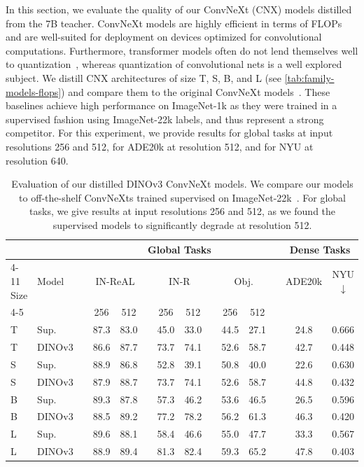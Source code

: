 In this section, we evaluate the quality of our ConvNeXt (CNX) models distilled from the 7B teacher. 
ConvNeXt models are highly efficient in terms of FLOPs and are well-suited for deployment on devices optimized for convolutional computations. 
Furthermore, transformer models often do not lend themselves well to quantization~\citep{bondarenko2021understanding}, whereas quantization of convolutional nets is a well explored subject.
We distill CNX architectures of size T, S, B, and L (see \cref{tab:family-models-flops}) and compare them to the original ConvNeXt models~\citep{liu2022convnet}.
These baselines achieve high performance on ImageNet-1k as they were trained in a supervised fashion using ImageNet-22k labels, and thus represent a strong competitor.
For this experiment, we provide results for global tasks at input resolutions 256 and 512, for ADE20k at resolution 512, and for NYU at resolution 640.

\begin{table}[t]
    \centering
    \caption{
      Evaluation of our distilled DINOv3 ConvNeXt models.
      We compare our models to off-the-shelf ConvNeXts trained supervised on ImageNet-22k~\citep{liu2022convnet}.
      For global tasks, we give results at input resolutions 256 and 512, as we found the supervised models to significantly degrade at resolution 512.
    }
    \begin{tabular}{@{}ll c  cc c cc c cc  c cc@{}}
    \toprule
    & && \multicolumn{8}{c}{Global Tasks} && \multicolumn{2}{c}{Dense Tasks} \\
    \cmidrule{4-11} \cmidrule{13-14}
    Size & Model && \multicolumn{2}{c}{IN-ReAL} && \multicolumn{2}{c}{IN-R} && \multicolumn{2}{c}{Obj.} && ADE20k & NYU$\downarrow$ \\
    \cmidrule{4-5} \cmidrule{7-8} \cmidrule{10-11}
    &&& 256 & 512 && 256 & 512 && 256 & 512 && & \\
    \midrule
    T & Sup.  && 87.3 & 83.0 && 45.0 & 33.0 && 44.5 & 27.1 && 24.8 & 0.666 \\
    T & DINOv3 && 86.6 & 87.7 && 73.7 & 74.1 && 52.6 & 58.7 && 42.7 & 0.448 \\
    \midrule
    S & Sup.  && 88.9 & 86.8 && 52.8 & 39.1 && 50.8 & 40.0 && 22.6 & 0.630 \\
    S & DINOv3  && 87.9 & 88.7 && 73.7 & 74.1 && 52.6 & 58.7 && 44.8 & 0.432\\
    \midrule
    B & Sup.  && 89.3 & 87.8 && 57.3 & 46.2 && 53.6 & 46.5 && 26.5 & 0.596 \\
    B & DINOv3  && 88.5 & 89.2 && 77.2 & 78.2 && 56.2 & 61.3 && 46.3 & 0.420 \\
    \midrule
    L & Sup.  && 89.6 & 88.1 && 58.4 & 46.6 && 55.0 & 47.7 && 33.3 & 0.567 \\
    L & DINOv3  && 88.9 & 89.4 && 81.3 & 82.4 && 59.3 & 65.2 && 47.8 & 0.403 \\
    \bottomrule
\end{tabular}
    \label{tab:family:convnext}
\end{table}

